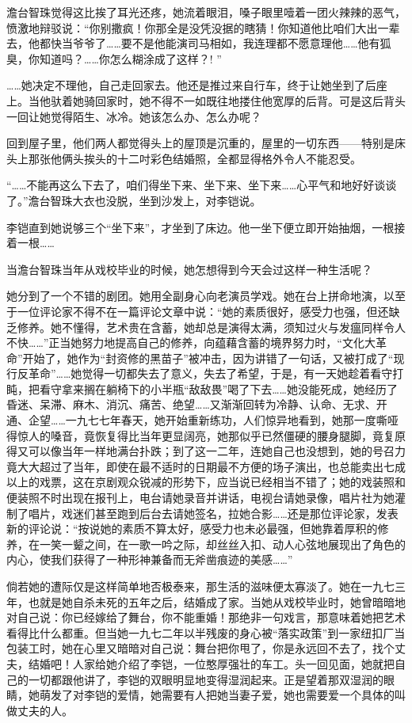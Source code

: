 \par 澹台智珠觉得这比挨了耳光还疼，她流着眼泪，嗓子眼里噎着一团火辣辣的恶气，愤激地辩驳说：“你别撒疯！你那全是没凭没据的瞎猜！你知道他比咱们大出一辈去，他都快当爷爷了……要不是他能演司马相如，我连理都不愿意理他……他有狐臭，你知道吗？……你怎么糊涂成了这样？! ”
\par ……她决定不理他，自己走回家去。他还是推过来自行车，终于让她坐到了后座上。当他驮着她骑回家时，她不得不一如既往地搂住他宽厚的后背。可是这后背头一回让她觉得陌生、冰冷。她该怎么办、怎么办呢？
\par 回到屋子里，他们两人都觉得头上的屋顶是沉重的，屋里的一切东西——特别是床头上那张他俩头挨头的十二吋彩色结婚照，全都显得格外令人不能忍受。
\par “……不能再这么下去了，咱们得坐下来、坐下来、坐下来……心平气和地好好谈谈了。”澹台智珠大衣也没脱，坐到沙发上，对李铠说。
\par 李铠直到她说够三个“坐下来”，才坐到了床边。他一坐下便立即开始抽烟，一根接着一根……
\par 当澹台智珠当年从戏校毕业的时候，她怎想得到今天会过这样一种生活呢？
\par 她分到了一个不错的剧团。她用全副身心向老演员学戏。她在台上拼命地演，以至于一位评论家不得不在一篇评论文章中说：“她的素质很好，感受力也强，但还缺乏修养。她不懂得，艺术贵在含蓄，她却总是演得太满，须知过火与发瘟同样令人不快……”正当她努力地提高自己的修养，向蕴藉含蓄的境界努力时，“文化大革命”开始了，她作为“封资修的黑苗子”被冲击，因为讲错了一句话，又被打成了“现行反革命”……她觉得一切都失去了意义，失去了希望，于是，有一天她趁着看守打盹，把看守拿来搁在躺椅下的小半瓶“敌敌畏”喝了下去……她没能死成，她经历了昏迷、呆滞、麻木、消沉、痛苦、绝望……又渐渐回转为冷静、认命、无求、开通、企望……一九七七年春天，她开始重新练功，人们惊异地看到，她那一度嘶哑得惊人的嗓音，竟恢复得比当年更显阔亮，她那似乎已然僵硬的腰身腿脚，竟复原得又可以像当年一样地满台扑跌；到了这一二年，连她自己也没想到，她的号召力竟大大超过了当年，即使在最不适时的日期最不方便的场子演出，也总能卖出七成以上的戏票，这在京剧观众锐减的形势下，应当说已经相当不错了；她的戏装照和便装照不时出现在报刊上，电台请她录音并讲话，电视台请她录像，唱片社为她灌制了唱片，戏迷们甚至跑到后台去请她签名，拉她合影……还是那位评论家，发表新的评论说：“按说她的素质不算太好，感受力也未必最强，但她靠着厚积的修养，在一笑一颦之间，在一歌一吟之际，却丝丝入扣、动人心弦地展现出了角色的内心，使我们获得了一种形神兼备而无斧凿痕迹的美感……”
\par 倘若她的遭际仅是这样简单地否极泰来，那生活的滋味便太寡淡了。她在一九七三年，也就是她自杀未死的五年之后，结婚成了家。当她从戏校毕业时，她曾暗暗地对自己说：你已经嫁给了舞台，你不能重婚！那绝非一句戏言，那意味着她把艺术看得比什么都重。但当她一九七二年以半残废的身心被“落实政策”到一家纽扣厂当包装工时，她在心里又暗暗对自己说：舞台把你甩了，你是永远回不去了，找个丈夫，结婚吧！人家给她介绍了李铠，一位憨厚强壮的车工。头一回见面，她就把自己的一切都跟他讲了，李铠的双眼明显地变得湿润起来。正是望着那双湿润的眼睛，她萌发了对李铠的爱情，她需要有人把她当妻子爱，她也需要爱一个具体的叫做丈夫的人。
